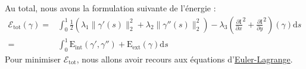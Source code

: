 \documentclass[10pt,a4paper]{article}
\begin{document}
Au total, nous avons la formulation suivante de l'\'{e}nergie : 
\begin{eqnarray}\label{fonctionnelle}
	\mathcal{E}_{\text{tot}}(\gamma) =& \int_{0}^{1} \frac{1}{2} \left(\lambda_1 \|\gamma'(s) \|_{2}^{2} + \lambda_2 \|\gamma''(s) \|_{2}^{2}\right)  - \lambda_3    \left( \frac{\partial \text{I}}{\partial x}^{2} + \frac{\partial \text{I}}{\partial y}^{2} \right)(\gamma) \mathrm{d}s\\
	= & \int_{0}^{1} \text{E}_{\text{int}}(\gamma',\gamma'') + \text{E}_{\text{ext}}(\gamma) \mathrm{d}s
\end{eqnarray}
Pour minimiser $\mathcal{E}_{\text{tot}}$, nous allons avoir recours aux \'{e}quations d'\href{https://e-campus.cpe.fr/file.php/2552/Cours\_Meca.pdf}{Euler-Lagrange}.
\end{document}
